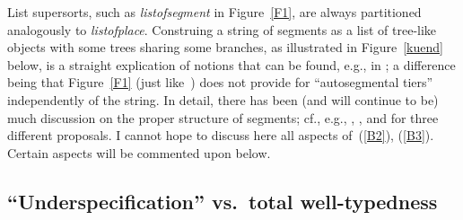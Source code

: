 \documentclass[output=paper]{langsci/langscibook}
\begin{document}
List supersorts, such as \textit{listofsegment}\/ in Figure~\ref{F1}, are
always partitioned analogously to \textit{listofplace}\/. Construing a string
of segments as a list of tree-like objects with some trees sharing some
branches, as illustrated in Figure~\ref{kuend} below, is a straight
explication of notions that can be found, e.g.,
in \cite[237]{clem:85}; a difference being that
Figure~\ref{F1} (just like~\citealt{scob:97}) does not
provide for ``autosegmental tiers'' independently of the  string.
In detail, there has been (and will continue to be) much discussion on the
proper structure of segments; cf., e.g., \cite[Chapter~4]{bird:95}, \cite{cle:hum:95}, and \cite{lade:97} for three different
proposals. I cannot hope to discuss here all aspects of~(\ref{B2}),
(\ref{B3}). %
Certain aspects will be commented upon below.



\subsection{``Underspecification'' vs.\ total well-typedness}
\label{sec:1.2.2}
\end{document}
